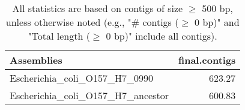 \documentclass[12pt,a4paper]{article}
\begin{document}
\begin{table}[ht]
\begin{center}
\caption{All statistics are based on contigs of size $\geq$ 500 bp, unless otherwise noted (e.g., "\# contigs ($\geq$ 0 bp)" and "Total length ($\geq$ 0 bp)" include all contigs).}
\begin{tabular}{|l*{1}{|r}|}
\hline
Assemblies & final.contigs \\ \hline
Escherichia\_coli\_O157\_H7\_0990 & 623.27 \\ \hline
Escherichia\_coli\_O157\_H7\_ancestor & 600.83 \\ \hline
\end{tabular}
\end{center}
\end{table}
\end{document}
